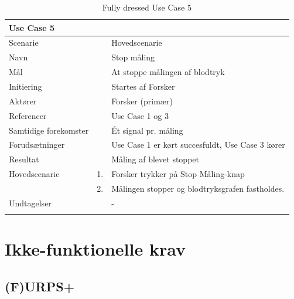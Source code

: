 \begin{longtabu} to  %
	{\large \textbf{Use Case 5}} && \\
	\toprule
	Scenarie && Hovedscenarie\\
	Navn && Stop måling \\
	Mål && At stoppe målingen af blodtryk\\
	Initiering && Startes af Forsker\\
	Aktører && Forsker (primær)\\
	Referencer && Use Case 1 og 3  \\
	Samtidige forekomster  &&  Ét signal pr. måling\\
	Forudsætninger && Use Case 1 er kørt succesfuldt, Use Case 3 kører\\
	Resultat && Måling af blevet stoppet\\ \midrule
	Hovedscenarie &    1. &		Forsker trykker på Stop Måling-knap\\[-1ex] 
	&    2. &   Målingen stopper og blodtryksgrafen fastholdes. \\ \midrule	 	
	Undtagelser &    & - 	\\ \bottomrule
	\caption{Fully dressed Use Case 5}
	\label{UC5}
\end{longtabu}

\section{Ikke-funktionelle krav}


\subsection{(F)URPS+}

